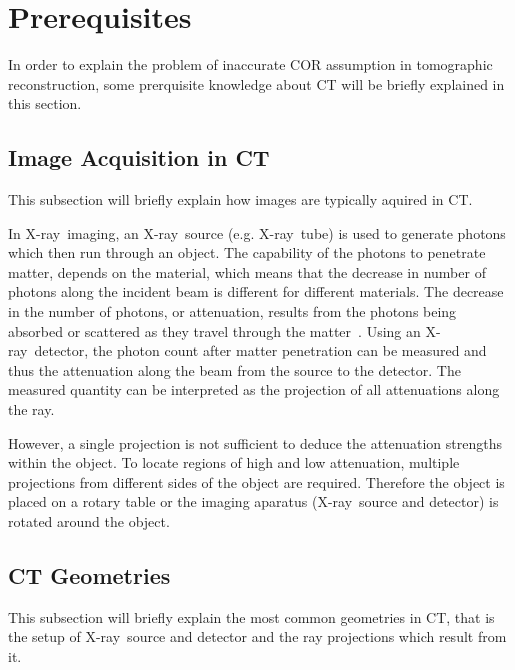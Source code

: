 \documentclass[10pt,journal,compsoc]{IEEEtran}
\newcommand{\xray}{X-ray~}
\begin{document}


\section{Prerequisites}
In order to explain the problem of inaccurate COR assumption in tomographic reconstruction, some prerquisite knowledge about CT will be briefly explained in this section.

\subsection{Image Acquisition in CT}
This subsection will briefly explain how images are typically aquired in CT.

In \xray imaging, an \xray source (e.g. \xray tube) is used to generate photons which then run through an object.
The capability of the photons to penetrate matter, depends on the material, which means that the decrease in number of photons along the incident beam is different for different materials.
The decrease in the number of photons, or attenuation, results from the photons being absorbed or scattered as they travel through the matter~\cite{Buzug2008_chap1}.
Using an \xray detector, the photon count after matter penetration can be measured and thus the attenuation along the beam from the source to the detector.
The measured quantity can be interpreted as the projection of all attenuations along the ray.

However, a single projection is not sufficient to deduce the attenuation strengths within the object. 
To locate regions of high and low attenuation, multiple projections from different sides of the object are required.
Therefore the object is placed on a rotary table or the imaging aparatus (\xray source and detector) is rotated around the object.


\subsection{CT Geometries}
This subsection will briefly explain the most common geometries in CT, that is the setup of \xray source and detector and the ray projections which result from it.
\end{document}
